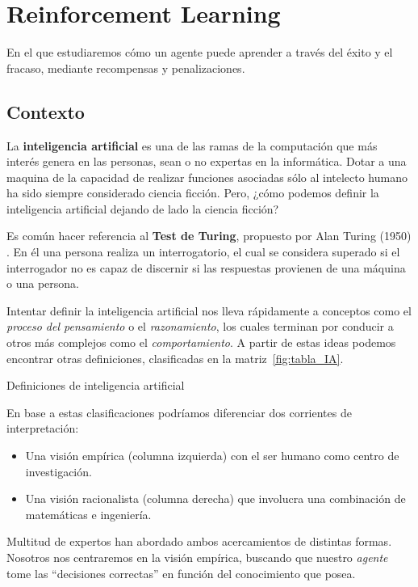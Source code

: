 \chapter{Reinforcement Learning}
\label{cap:reinforcementLearning}

En el que estudiaremos cómo un agente puede aprender a través del éxito y el fracaso, mediante recompensas y penalizaciones.


\section{Contexto}
La \textbf{inteligencia artificial} es una de las ramas de la computación que más interés genera en las personas, sean o no expertas en la informática. Dotar a una maquina de la capacidad de realizar funciones asociadas sólo al intelecto humano ha sido siempre considerado ciencia ficción. Pero, ¿cómo podemos definir la inteligencia artificial dejando de lado la ciencia ficción?

Es común hacer referencia al \textbf{Test de Turing}, propuesto por Alan Turing (1950) . En él una persona realiza un interrogatorio, el cual se considera superado si el interrogador no es capaz de discernir si las respuestas provienen de una máquina o una persona.

Intentar definir la inteligencia artificial nos lleva rápidamente a conceptos como el \textit{proceso del pensamiento} o el \textit{razonamiento}, los cuales terminan por conducir a otros más complejos como el \textit{comportamiento}. A partir de estas ideas podemos encontrar otras definiciones, clasificadas en la matriz~\ref{fig:tabla_IA}.

%
       {Definiciones de inteligencia artificial}

En base a estas clasificaciones podríamos diferenciar dos corrientes de interpretación:
\begin{itemize}
    \item Una visión empírica (columna izquierda) con el ser humano como centro de investigación.
    \item Una visión racionalista (columna derecha) que involucra una combinación de matemáticas e ingeniería.
\end{itemize}

Multitud de expertos han abordado ambos acercamientos de distintas formas. Nosotros nos centraremos en la visión empírica, buscando que nuestro \textit{agente} tome las ``decisiones correctas'' en función del conocimiento que posea.


